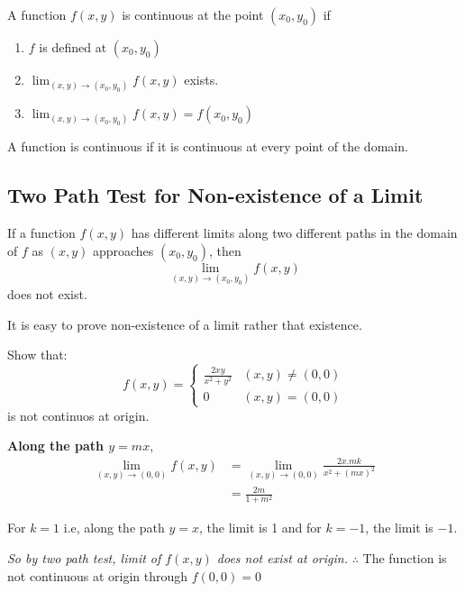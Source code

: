 \begin{definition}
  \label{def:continuity-of-a-multivarite-function}
  A function \( f(x, y) \) is continuous at the point \( (x_0, y_0) \) if
  \begin{enumerate}
    \item \( f \) is defined at \( (x_0, y_0) \)
    \item \( \displaystyle \lim_{(x,y) \to (x_0,y_0)} f(x,y) \) exists.
    \item \( \displaystyle \lim_{(x,y) \to (x_0,y_0)} f(x,y) = f(x_0, y_0) \)
  \end{enumerate}

  A function is continuous if it is continuous at every point of the domain.
\end{definition}

\subsection{Two Path Test for Non-existence of a Limit}
\label{ssec:two-path-test-for-non-existence-of-a-limit}

If a function \( f(x,y) \) has different limits along two different paths in the domain of \( f \) as \( (x,y) \) approaches \( (x_0,y_0) \), then
\[
  \lim_{(x,y) \to (x_0,y_0)} f(x,y)
\]
does not exist.

\begin{remark}
  It is easy to prove non-existence of a limit rather that existence.
  \begin{eg}
    Show that:
    \[ 
      f(x,y)=
      \begin{cases}
        \frac{2xy}{x^2+y^2}&(x,y)\neq (0,0)\\
        0&(x,y)=(0,0)
      \end{cases}
    \] 
    is not continuos at origin.
  \end{eg}
  \begin{answer}
    \textbf{Along the path \(y=mx\)},
    \begin{align}
      \lim_{(x,y) \to (0,0)} f(x,y)
    &=\lim_{(x,y) \to (0,0)} \frac{2x.mk}{x^2+(mx)^2}\\
    &=\frac{2m}{1+m^2}
    \end{align}

    For \(k=1\) i.e, along the path \(y=x\), the limit is 1 and for \(k=-1\),
    the limit is \(-1\).

    \emph{So by two path test, limit of \(f(x,y)\) does not exist at origin.}
    \(\therefore\) The function is not continuous at origin through \(f(0,0)=0\)
  \end{answer}
\end{remark}


